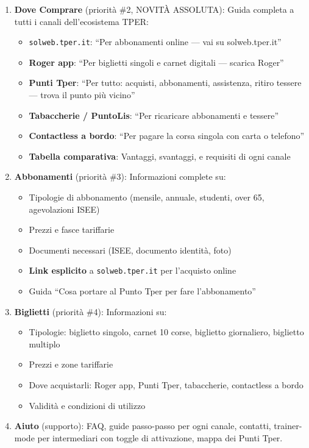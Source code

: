 \begin{tcolorbox}[colback=backgroundColor,colframe=borderColor,arc=2mm]
{\begin{enumerate}[leftmargin=*]
 \item \textbf{Dove Comprare} (priorità \#2, NOVITÀ ASSOLUTA): Guida completa a tutti i canali dell'ecosistema TPER:
 \begin{itemize}
   \item \texttt{solweb.tper.it}: ``Per abbonamenti online --- vai su solweb.tper.it''
   \item \textbf{Roger app}: ``Per biglietti singoli e carnet digitali --- scarica Roger''
   \item \textbf{Punti Tper}: ``Per tutto: acquisti, abbonamenti, assistenza, ritiro tessere --- trova il punto più vicino''
   \item \textbf{Tabaccherie / PuntoLis}: ``Per ricaricare abbonamenti e tessere''
   \item \textbf{Contactless a bordo}: ``Per pagare la corsa singola con carta o telefono''
   \item \textbf{Tabella comparativa}: Vantaggi, svantaggi, e requisiti di ogni canale
 \end{itemize}

 \item \textbf{Abbonamenti} (priorità \#3): Informazioni complete su:
 \begin{itemize}
   \item Tipologie di abbonamento (mensile, annuale, studenti, over 65, agevolazioni ISEE)
   \item Prezzi e fasce tariffarie
   \item Documenti necessari (ISEE, documento identità, foto)
   \item \textbf{Link esplicito} a \texttt{solweb.tper.it} per l'acquisto online
   \item Guida ``Cosa portare al Punto Tper per fare l'abbonamento''
 \end{itemize}

 \item \textbf{Biglietti} (priorità \#4): Informazioni su:
 \begin{itemize}
   \item Tipologie: biglietto singolo, carnet 10 corse, biglietto giornaliero, biglietto multiplo
   \item Prezzi e zone tariffarie
   \item Dove acquistarli: Roger app, Punti Tper, tabaccherie, contactless a bordo
   \item Validità e condizioni di utilizzo
 \end{itemize}

 \item \textbf{Aiuto} (supporto): FAQ, guide passo-passo per ogni canale, contatti, trainer-mode per intermediari con toggle di attivazione, mappa dei Punti Tper.
\end{enumerate}

}
\end{tcolorbox}
